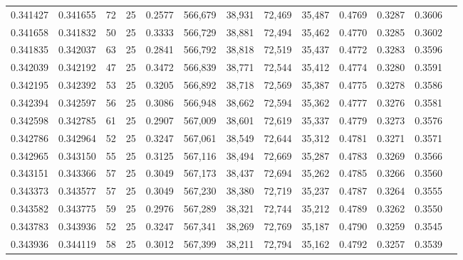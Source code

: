 \begin{tabular}{rrrrrrrrrrrrr}
0.341427 & 0.341655 &    72 &  25 &                                     0.2577 & 566,679 &  38,931 &  72,469 &  35,487 & 0.4769 & 0.3287 & 0.3606 \\
0.341658 & 0.341832 &    50 &  25 &                                     0.3333 & 566,729 &  38,881 &  72,494 &  35,462 & 0.4770 & 0.3285 & 0.3602 \\
0.341835 & 0.342037 &    63 &  25 &                                     0.2841 & 566,792 &  38,818 &  72,519 &  35,437 & 0.4772 & 0.3283 & 0.3596 \\
0.342039 & 0.342192 &    47 &  25 &                                     0.3472 & 566,839 &  38,771 &  72,544 &  35,412 & 0.4774 & 0.3280 & 0.3591 \\
0.342195 & 0.342392 &    53 &  25 &                                     0.3205 & 566,892 &  38,718 &  72,569 &  35,387 & 0.4775 & 0.3278 & 0.3586 \\
0.342394 & 0.342597 &    56 &  25 &                                     0.3086 & 566,948 &  38,662 &  72,594 &  35,362 & 0.4777 & 0.3276 & 0.3581 \\
0.342598 & 0.342785 &    61 &  25 &                                     0.2907 & 567,009 &  38,601 &  72,619 &  35,337 & 0.4779 & 0.3273 & 0.3576 \\
0.342786 & 0.342964 &    52 &  25 &                                     0.3247 & 567,061 &  38,549 &  72,644 &  35,312 & 0.4781 & 0.3271 & 0.3571 \\
0.342965 & 0.343150 &    55 &  25 &                                     0.3125 & 567,116 &  38,494 &  72,669 &  35,287 & 0.4783 & 0.3269 & 0.3566 \\
0.343151 & 0.343366 &    57 &  25 &                                     0.3049 & 567,173 &  38,437 &  72,694 &  35,262 & 0.4785 & 0.3266 & 0.3560 \\
0.343373 & 0.343577 &    57 &  25 &                                     0.3049 & 567,230 &  38,380 &  72,719 &  35,237 & 0.4787 & 0.3264 & 0.3555 \\
0.343582 & 0.343775 &    59 &  25 &                                     0.2976 & 567,289 &  38,321 &  72,744 &  35,212 & 0.4789 & 0.3262 & 0.3550 \\
0.343783 & 0.343936 &    52 &  25 &                                     0.3247 & 567,341 &  38,269 &  72,769 &  35,187 & 0.4790 & 0.3259 & 0.3545 \\
0.343936 & 0.344119 &    58 &  25 &                                     0.3012 & 567,399 &  38,211 &  72,794 &  35,162 & 0.4792 & 0.3257 & 0.3539 \\

\end{tabular}
